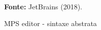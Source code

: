\begin{figure}[ht!]
\centering

\caption{\textmd{MPS editor - sintaxe abstrata}}
\label{fig:mpseditor}

\par\medskip\textbf{Fonte:} JetBrains (2018). \par\medskip
\end{figure}
